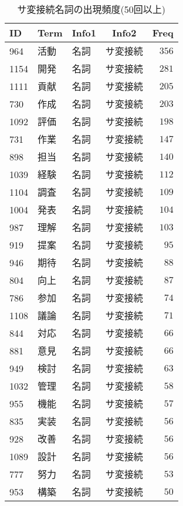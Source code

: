 %
\begin{table}[!tbp]
\caption{サ変接続名詞の出現頻度(50回以上)\label{tab:サ変接続名詞}} 
\begin{center}
\begin{tabular}{llllr}
\toprule
\multicolumn{1}{l}{ID}&\multicolumn{1}{c}{Term}&\multicolumn{1}{c}{Info1}&\multicolumn{1}{c}{Info2}&\multicolumn{1}{c}{Freq}\tabularnewline
\midrule
964&活動&名詞&サ変接続&$356$\tabularnewline
1154&開発&名詞&サ変接続&$281$\tabularnewline
1111&貢献&名詞&サ変接続&$205$\tabularnewline
730&作成&名詞&サ変接続&$203$\tabularnewline
1092&評価&名詞&サ変接続&$198$\tabularnewline
731&作業&名詞&サ変接続&$147$\tabularnewline
898&担当&名詞&サ変接続&$140$\tabularnewline
1039&経験&名詞&サ変接続&$112$\tabularnewline
1104&調査&名詞&サ変接続&$109$\tabularnewline
1004&発表&名詞&サ変接続&$104$\tabularnewline
987&理解&名詞&サ変接続&$103$\tabularnewline
919&提案&名詞&サ変接続&$ 95$\tabularnewline
946&期待&名詞&サ変接続&$ 88$\tabularnewline
804&向上&名詞&サ変接続&$ 87$\tabularnewline
786&参加&名詞&サ変接続&$ 74$\tabularnewline
1108&議論&名詞&サ変接続&$ 71$\tabularnewline
844&対応&名詞&サ変接続&$ 66$\tabularnewline
881&意見&名詞&サ変接続&$ 66$\tabularnewline
949&検討&名詞&サ変接続&$ 63$\tabularnewline
1032&管理&名詞&サ変接続&$ 58$\tabularnewline
955&機能&名詞&サ変接続&$ 57$\tabularnewline
835&実装&名詞&サ変接続&$ 56$\tabularnewline
928&改善&名詞&サ変接続&$ 56$\tabularnewline
1089&設計&名詞&サ変接続&$ 56$\tabularnewline
777&努力&名詞&サ変接続&$ 53$\tabularnewline
953&構築&名詞&サ変接続&$ 50$\tabularnewline
\bottomrule
\end{tabular}
\end{center}
\end{table}

